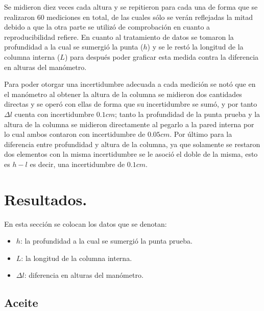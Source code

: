 \documentclass[a4paper]{article}
\begin{document}
Se midieron diez veces cada altura y se repitieron para cada una de forma que se realizaron 60 mediciones en total, de las cuales sólo se verán reflejadas la mitad debido a que la otra parte se utilizó de comprobación en cuanto a reproducibilidad refiere. En cuanto al tratamiento de datos se tomaron la profundidad a la cual se sumergió la punta ($h$) y se le restó la longitud de la columna interna ($L$) para después poder graficar esta medida contra la diferencia en alturas del manómetro.


Para poder otorgar una incertidumbre adecuada a cada medición se notó que en el manómetro al obtener la altura de la columna se midieron dos cantidades directas y se operó con ellas de forma que su incertidumbre se sumó, y por tanto $\Delta l$ cuenta con incertidumbre $0.1 cm$; tanto la profundidad de la punta prueba y la altura de la columna se midieron directamente al pegarlo a la pared interna por lo cual ambos contaron con incertidumbre de $0.05 cm$. Por último para la diferencia entre profundidad y altura de la columna, ya que solamente se restaron dos elementos con la misma incertidumbre se le asoció el doble de la misma, esto es $h-l$ es decir, una  incertidumbre de $0.1 cm$.

\section*{Resultados.}
En esta sección se colocan los datos que se denotan:
\begin{itemize}
    \item $h$: la profundidad a la cual se sumergió la punta prueba.
    \item $L$: la longitud de la columna interna.
    \item $\Delta l$: diferencia en alturas del manómetro.
\end{itemize}

\subsection*{Aceite}
\end{document}
